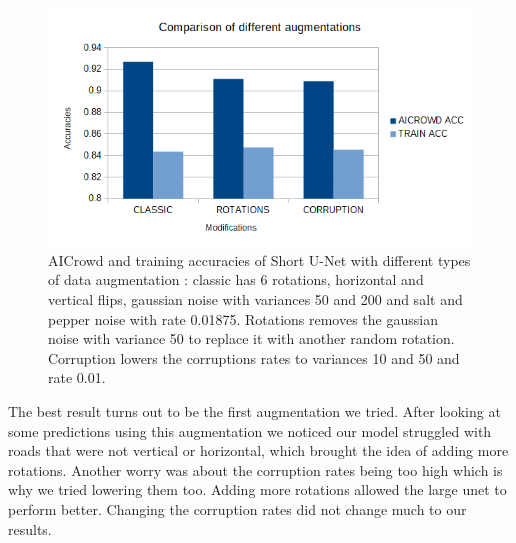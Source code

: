 \documentclass[10pt,conference,compsocconf]{IEEEtran}
\begin{document}
\begin{figure}[H]
    \centering
    \includegraphics[scale = 0.4]{report_images/data_graph.png} %
    \caption{AICrowd and training accuracies of Short U-Net with different types of data augmentation : classic has 6 rotations, horizontal and vertical flips, gaussian noise with variances 50 and 200 and salt and pepper noise with rate 0.01875. Rotations removes the gaussian noise with variance 50 to replace it with another random rotation. Corruption lowers the corruptions rates to variances 10 and 50 and rate 0.01.}
\end{figure}
The best result turns out to be the first augmentation we tried. After looking at some predictions using this augmentation we noticed our model struggled with roads that were not vertical or horizontal, which brought the idea of adding more rotations. Another worry was about the corruption rates being too high which is why we tried lowering them too. Adding more rotations allowed the large unet to perform better. Changing the corruption rates did not change much to our results.
\end{document}
